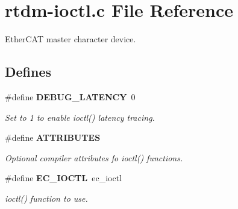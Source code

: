 \section{rtdm-\/ioctl.c \-File \-Reference}
\label{rtdm-ioctl_8c}


\-Ether\-C\-A\-T master character device.  


\subsection*{\-Defines}
\begin{DoxyCompactItemize}
\item 
\#define {\bf \-D\-E\-B\-U\-G\-\_\-\-L\-A\-T\-E\-N\-C\-Y}~0
\begin{DoxyCompactList}\small\item\em \-Set to 1 to enable ioctl() latency tracing. \end{DoxyCompactList}\item 
\#define {\bf \-A\-T\-T\-R\-I\-B\-U\-T\-E\-S}\label{rtdm-ioctl_8c_ae456bc7dfd6c3d54bccef2e234ecae7a}

\begin{DoxyCompactList}\small\item\em \-Optional compiler attributes fo ioctl() functions. \end{DoxyCompactList}\item 
\#define {\bf \-E\-C\-\_\-\-I\-O\-C\-T\-L}~ec\-\_\-ioctl\label{rtdm-ioctl_8c_a80a51dad3458ecb73d12369fa9b50a02}

\begin{DoxyCompactList}\small\item\em ioctl() function to use. \end{DoxyCompactList}\end{DoxyCompactItemize}

